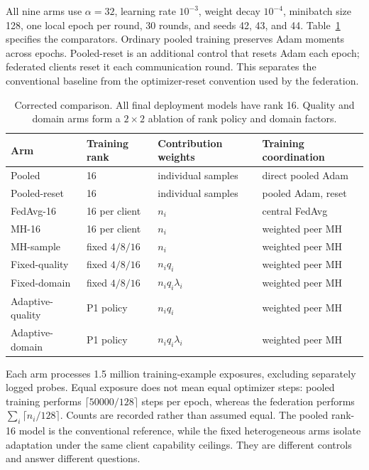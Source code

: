 \documentclass[11pt]{article}
\begin{document}
All nine arms use $\alpha=32$, learning rate $10^{-3}$, weight decay $10^{-4}$, minibatch size 128, one local epoch per round, 30 rounds, and seeds 42, 43, and 44. Table~\ref{tab:design} specifies the comparators. Ordinary pooled training preserves Adam moments across epochs. Pooled-reset is an additional control that resets Adam each epoch; federated clients reset it each communication round. This separates the conventional baseline from the optimizer-reset convention used by the federation.

\begin{table}[t]
\centering
\caption{Corrected comparison. All final deployment models have rank 16. Quality and domain arms form a $2\times2$ ablation of rank policy and domain factors.}
\label{tab:design}
\small
\begin{tabular}{llll}
\toprule
Arm & Training rank & Contribution weights & Training coordination\\
\midrule
Pooled & 16 & individual samples & direct pooled Adam\\
Pooled-reset & 16 & individual samples & pooled Adam, reset\\
FedAvg-16 & 16 per client & $n_i$ & central FedAvg\\
MH-16 & 16 per client & $n_i$ & weighted peer MH\\
MH-sample & fixed $4/8/16$ & $n_i$ & weighted peer MH\\
Fixed-quality & fixed $4/8/16$ & $n_iq_i$ & weighted peer MH\\
Fixed-domain & fixed $4/8/16$ & $n_iq_i\lambda_i$ & weighted peer MH\\
Adaptive-quality & P1 policy & $n_iq_i$ & weighted peer MH\\
Adaptive-domain & P1 policy & $n_iq_i\lambda_i$ & weighted peer MH\\
\bottomrule
\end{tabular}
\end{table}

Each arm processes 1.5 million training-example exposures, excluding separately logged probes. Equal exposure does not mean equal optimizer steps: pooled training performs $\lceil50000/128\rceil$ steps per epoch, whereas the federation performs $\sum_i\lceil n_i/128\rceil$. Counts are recorded rather than assumed equal. The pooled rank-16 model is the conventional reference, while the fixed heterogeneous arms isolate adaptation under the same client capability ceilings. They are different controls and answer different questions.
\end{document}

